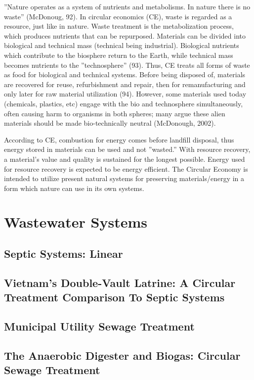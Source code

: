 ''Nature operates as a system of nutrients and metabolisms. In nature there is no waste'' (McDonoug, 92). In circular economics (CE), waste is regarded as a resource, just like in nature. Waste treatment is the metabolization process, which produces nutrients that can be repurposed. Materials can be divided into biological and technical mass (technical being industrial). Biological nutrients which contribute to the biosphere return to the Earth, while technical mass becomes nutrients to the ''technosphere'' (93). Thus, CE treats all forms of waste as food for biological and technical systems. Before being disposed of, materials are recovered for reuse, refurbishment and repair, then for remanufacturing and only later for raw material utilization (94). However, some materials used today (chemicals, plastics, etc) engage with the bio and technosphere simultaneously, often causing harm to organisms in both spheres; many argue these alien materials should be made bio-technically neutral (McDonough, 2002). 

According to CE, combustion for energy comes before landﬁll disposal, thus energy stored in materials can be used and not ''wasted.'' With resource recovery, a material’s value and quality is sustained for the longest possible. Energy used for resource recovery is expected to be energy efficient. The Circular Economy is intended to utilize present natural systems for preserving materials/energy in a form which nature can use in its own systems. 


\section{Wastewater Systems}

\subsection{Septic Systems: Linear}

\subsection{Vietnam’s Double-Vault Latrine: A Circular Treatment Comparison To Septic Systems }

\subsection{Municipal Utility Sewage Treatment}

\subsection{The Anaerobic Digester and Biogas: Circular Sewage Treatment}


